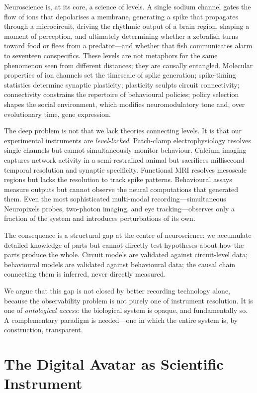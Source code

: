 \documentclass[12pt,a4paper]{article}
\begin{document}
Neuroscience is, at its core, a science of levels.
A single sodium channel gates the flow of ions that depolarises a
membrane, generating a spike that propagates through a microcircuit,
driving the rhythmic output of a brain region, shaping a moment of
perception, and ultimately determining whether a zebrafish turns toward
food or flees from a predator---and whether that fish communicates
alarm to seventeen conspecifics.
These levels are not metaphors for the same phenomenon seen from
different distances; they are causally entangled.
Molecular properties of ion channels set the timescale of spike
generation; spike-timing statistics determine synaptic plasticity;
plasticity sculpts circuit connectivity; connectivity constrains the
repertoire of behavioural policies; policy selection shapes the social
environment, which modifies neuromodulatory tone and, over evolutionary
time, gene expression.

The deep problem is not that we lack theories connecting levels.
It is that our experimental instruments are \emph{level-locked}.
Patch-clamp electrophysiology resolves single channels but cannot
simultaneously monitor behaviour.
Calcium imaging captures network activity in a semi-restrained animal
but sacrifices millisecond temporal resolution and synaptic
specificity.
Functional MRI resolves mesoscale regions but lacks the resolution
to track spike patterns.
Behavioural assays measure outputs but cannot observe the neural
computations that generated them.
Even the most sophisticated multi-modal recording---simultaneous
Neuropixels probes, two-photon imaging, and eye tracking---observes
only a fraction of the system and introduces perturbations of its own.

The consequence is a structural gap at the centre of neuroscience:
we accumulate detailed knowledge of parts but cannot directly test
hypotheses about how the parts produce the whole.
Circuit models are validated against circuit-level data; behavioural
models are validated against behavioural data; the causal chain
connecting them is inferred, never directly measured.

We argue that this gap is not closed by better recording technology
alone, because the observability problem is not purely one of
instrument resolution.
It is one of \emph{ontological access}: the biological system is
opaque, and fundamentally so.
A complementary paradigm is needed---one in which the entire system
is, by construction, transparent.


\section*{The Digital Avatar as Scientific Instrument}
\end{document}
